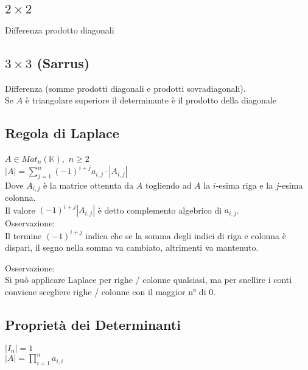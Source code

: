 \documentclass[a4paper, twoside, italian, 11pt]{book}
\newcommand{\detm}[1] {\left | #1 \right |}
\newcommand{\K}{\mathbb K}
\begin{document}
\subsection{$2 \times 2$}

Differenza prodotto diagonali


\subsection{$3 \times 3$ (Sarrus)}

Differenza (somme prodotti diagonali e prodotti sovradiagonali). \\

\noindent
Se $A$ è triangolare superiore il determinante è il prodotto della diagonale


\subsection{Regola di Laplace}

$A \in Mat_n(\K),$ $n \geq 2$ \\

\noindent
$\detm A = \sum\limits_{j=1}^{n} (-1)^{i+j} a_{i,j} \cdot \detm{A_{i,j}} $ \\

\noindent
Dove $A_{i,j}$ è la matrice ottenuta da $A$ togliendo ad $A$ la $i$-esima riga e la $j$-esima colonna. \\

\noindent
Il valore $(-1)^{i+j} \detm{A_{i,j}}$ è detto complemento algebrico di $a_{i,j}$. \\

\noindent
Osservazione: \\
Il termine $(-1)^{i+j}$ indica che se la somma degli indici di riga e colonna è dispari, il segno nella somma va cambiato, altrimenti va mantenuto.

\noindent
Osservazione: \\
Si può applicare Laplace per righe / colonne qualsiasi, ma per snellire i conti conviene scegliere righe / colonne con il maggior n° di $0$.


\subsection{Proprietà dei Determinanti}

$\detm{I_n} = 1$ \\

\noindent
$\detm A = \prod_{i=1}^n a_{i,i}$ \\
\end{document}

